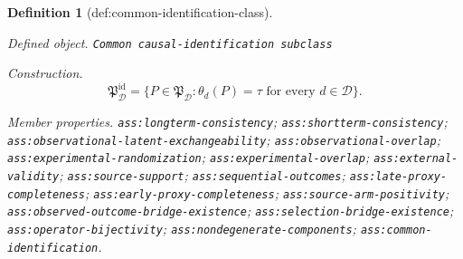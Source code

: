 \documentclass{article}
\newtheorem{definition}{Definition}
\begin{document}
\begin{definition}[def:common-identification-class]\label{def:common-identification-class}
\par\smallskip\noindent\emph{Defined object.} \texttt{Common causal-\allowbreak{}identification subclass}
\par\smallskip\noindent\emph{Construction.} \[
\mathfrak P_{\mathcal D}^{\mathrm{id}}
=\{P\in\mathfrak P_{\mathcal D}:\theta_d(P)=\tau\text{ for every }d\in\mathcal D\}.
\]
\par\smallskip\noindent\emph{Member properties.} \texttt{ass:\allowbreak{}longterm-\allowbreak{}consistency}; \texttt{ass:\allowbreak{}shortterm-\allowbreak{}consistency}; \texttt{ass:\allowbreak{}observational-\allowbreak{}latent-\allowbreak{}exchangeability}; \texttt{ass:\allowbreak{}observational-\allowbreak{}overlap}; \texttt{ass:\allowbreak{}experimental-\allowbreak{}randomization}; \texttt{ass:\allowbreak{}experimental-\allowbreak{}overlap}; \texttt{ass:\allowbreak{}external-\allowbreak{}validity}; \texttt{ass:\allowbreak{}source-\allowbreak{}support}; \texttt{ass:\allowbreak{}sequential-\allowbreak{}outcomes}; \texttt{ass:\allowbreak{}late-\allowbreak{}proxy-\allowbreak{}completeness}; \texttt{ass:\allowbreak{}early-\allowbreak{}proxy-\allowbreak{}completeness}; \texttt{ass:\allowbreak{}source-\allowbreak{}arm-\allowbreak{}positivity}; \texttt{ass:\allowbreak{}observed-\allowbreak{}outcome-\allowbreak{}bridge-\allowbreak{}existence}; \texttt{ass:\allowbreak{}selection-\allowbreak{}bridge-\allowbreak{}existence}; \texttt{ass:\allowbreak{}operator-\allowbreak{}bijectivity}; \texttt{ass:\allowbreak{}nondegenerate-\allowbreak{}components}; \texttt{ass:\allowbreak{}common-\allowbreak{}identification}.
\end{definition}
\end{document}
